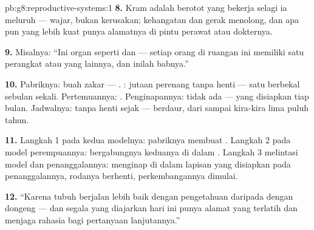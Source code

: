 \begin{solution}{pb:g8:reproductive-systems:1}
\textbf{8.} Kram adalah  berotot yang bekerja selagi ia
meluruh --- wajar, bukan kerusakan; kehangatan dan gerak
menolong, dan apa pun yang lebih kuat punya alamatnya di
pintu perawat atau dokternya.

\textbf{9.} Misalnya: ``Ini organ seperti  dan
 --- setiap orang di ruangan ini memiliki satu
perangkat atau yang lainnya, dan inilah babnya.''

\textbf{10.} Pabriknya: buah zakar --- .
: jutaan perenang tanpa henti --- satu  berbekal
sebulan sekali. Pertemuannya: . Penginapannya:
tidak ada ---  yang disiapkan tiap bulan. Jadwalnya:
tanpa henti sejak  --- berdaur, dari  sampai
kira-kira lima puluh tahun.

\textbf{11.} Langkah 1 pada kedua modelnya: pabriknya membuat
. Langkah 2 pada model perempuannya: bergabungnya
keduanya di dalam . Langkah 3 melintasi model
dan penanggalannya:  menginap di dalam lapisan yang
disiapkan pada penanggalannya, rodanya berhenti,
perkembangannya dimulai.

\textbf{12.} ``Karena tubuh berjalan lebih baik dengan
pengetahuan daripada dengan dongeng --- dan segala yang
diajarkan hari ini punya alamat yang terlatih dan menjaga
rahasia bagi pertanyaan lanjutannya.''
\end{solution}
